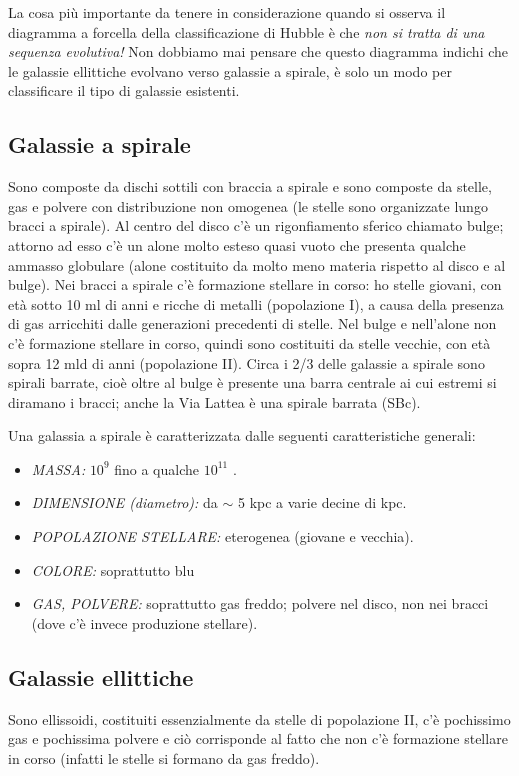 La cosa più importante da tenere in considerazione quando si osserva il diagramma a forcella della classificazione di Hubble è che \emph{non si tratta di una sequenza evolutiva!} Non dobbiamo mai pensare che questo diagramma indichi che le galassie ellittiche evolvano verso galassie a spirale, è solo un modo per classificare il tipo di galassie esistenti.

\subsection{Galassie a spirale} Sono composte da dischi sottili con braccia a spirale e sono composte da stelle, gas e polvere con distribuzione non omogenea (le stelle sono organizzate lungo bracci a spirale). Al centro del disco c’è un rigonfiamento sferico chiamato bulge; attorno ad esso c’è un alone molto esteso quasi vuoto che presenta qualche ammasso globulare (alone costituito da molto meno materia rispetto al disco e al bulge). Nei bracci a spirale c’è formazione stellare in corso: ho stelle giovani, con età sotto 10 ml di anni e ricche di metalli (popolazione I), a causa della presenza di gas arricchiti dalle generazioni precedenti di stelle. Nel bulge e nell’alone non c’è formazione stellare in corso, quindi sono costituiti da stelle vecchie, con età sopra 12 mld di anni (popolazione II). Circa i 2/3 delle galassie a spirale sono spirali barrate, cioè oltre al bulge è presente una barra centrale ai cui estremi si diramano i bracci; anche la Via Lattea è una spirale barrata (SBc).

Una galassia a spirale è caratterizzata dalle seguenti caratteristiche generali:
\begin{itemize}
	\item \emph{MASSA:} $10^9$ \unit{\solarmass{}} fino a qualche $10^{11}$ \unit{\solarmass{}}.
	\item \emph{DIMENSIONE (diametro):} da $\sim$ 5 kpc a varie decine di kpc.
	\item \emph{POPOLAZIONE STELLARE:} eterogenea (giovane e vecchia).
	\item \emph{COLORE:} soprattutto blu
	\item \emph{GAS, POLVERE:} soprattutto gas freddo; polvere nel disco, non nei bracci (dove c'è invece produzione stellare).
\end{itemize}

\subsection{Galassie ellittiche} Sono ellissoidi, costituiti essenzialmente da stelle di popolazione II, c’è pochissimo gas e pochissima polvere e ciò corrisponde al fatto che non c’è formazione stellare in corso (infatti le stelle si formano da gas freddo).

